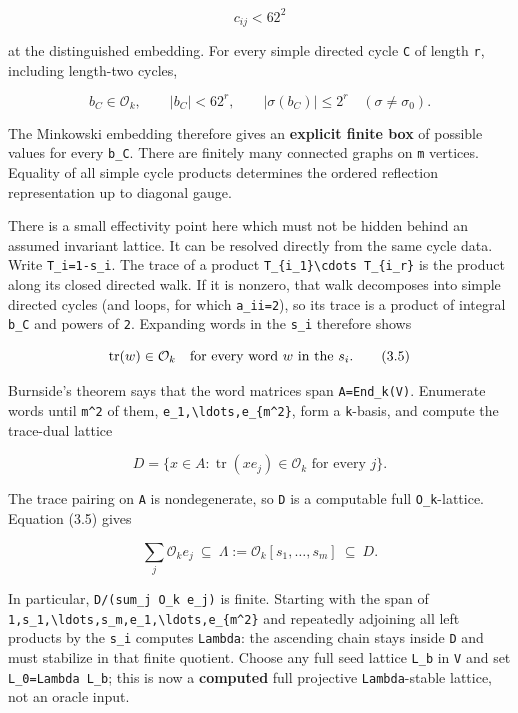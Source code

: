 \documentclass[
  10pt,
]{report}
\begin{document}
\[
 c_{ij}<62^2                                                   \tag{3.3}
\]

at the distinguished embedding. For every simple directed cycle
\texttt{C} of length \texttt{r}, including length-two cycles,

\[
 b_C\in\mathcal O_k,\qquad
 |b_C|<62^r,\qquad
 |\sigma(b_C)|\le 2^r\quad(\sigma\ne\sigma_0).          \tag{3.4}
\]

The Minkowski embedding therefore gives an \textbf{explicit finite box}
of possible values for every \texttt{b\_C}. There are finitely many
connected graphs on \texttt{m} vertices. Equality of all simple cycle
products determines the ordered reflection representation up to diagonal
gauge.

There is a small effectivity point here which must not be hidden behind
an assumed invariant lattice. It can be resolved directly from the same
cycle data. Write \texttt{T\_i=1-s\_i}. The trace of a product
\texttt{T\_\{i\_1\}\textbackslash{}cdots\ T\_\{i\_r\}} is the product
along its closed directed walk. If it is nonzero, that walk decomposes
into simple directed cycles (and loops, for which \texttt{a\_ii=2}), so
its trace is a product of integral \texttt{b\_C} and powers of
\texttt{2}. Expanding words in the \texttt{s\_i} therefore shows

\[
             \operatorname {tr}(w)\in\mathcal O_k
             \quad\hbox{for every word }w\hbox{ in the }s_i.       \tag{3.5}
\]

Burnside's theorem says that the word matrices span
\texttt{A=End\_k(V)}. Enumerate words until \texttt{m\^{}2} of them,
\texttt{e\_1,\textbackslash{}ldots,e\_\{m\^{}2\}}, form a
\texttt{k}-basis, and compute the trace-dual lattice

\[
 D=\{x\in A:\operatorname {tr}(xe_j)\in\mathcal O_k
                    \text{ for every }j\}.                         \tag{3.6}
\]

The trace pairing on \texttt{A} is nondegenerate, so \texttt{D} is a
computable full \texttt{O\_k}-lattice. Equation (3.5) gives

\[
 \sum_j\mathcal O_k e_j
       \ \subseteq\ \Lambda:=\mathcal O_k[s_1,\ldots,s_m]
       \ \subseteq\ D.                                             \tag{3.7}
\]

In particular, \texttt{D/(sum\_j\ O\_k\ e\_j)} is finite. Starting with
the span of
\texttt{1,s\_1,\textbackslash{}ldots,s\_m,e\_1,\textbackslash{}ldots,e\_\{m\^{}2\}}
and repeatedly adjoining all left products by the \texttt{s\_i} computes
\texttt{Lambda}: the ascending chain stays inside \texttt{D} and must
stabilize in that finite quotient. Choose any full seed lattice
\texttt{L\_b} in \texttt{V} and set \texttt{L\_0=Lambda\ L\_b}; this is
now a \textbf{computed} full projective \texttt{Lambda}-stable lattice,
not an oracle input.
\end{document}
